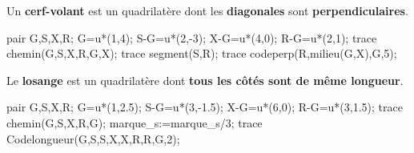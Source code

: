 \begin{changemargin}{-5mm}{-15mm}
    \begin{definition}
        \begin{minipage}{0.6\linewidth}
            Un \textbf{cerf-volant} est un quadrilatère dont les \textbf{diagonales} sont \textbf{perpendiculaires}.    
        \end{minipage}
        \hfill
        \begin{minipage}{0.3\linewidth}
            \begin{Geometrie}
                pair G,S,X,R;
                G=u*(1,4);
                S-G=u*(2,-3);
                X-G=u*(4,0);
                R-G=u*(2,1);
                trace chemin(G,S,X,R,G,X);
                trace segment(S,R);
                trace codeperp(R,milieu(G,X),G,5);
            \end{Geometrie}
        \end{minipage}
    \end{definition}

    \begin{definition}
        \begin{minipage}{0.5\linewidth}
            Le \textbf{losange} est un quadrilatère dont \textbf{tous les côtés sont de même longueur}.
        \end{minipage}
        \hfill
        \begin{minipage}{0.5\linewidth}
            \begin{center}
                \begin{Geometrie}
                    pair G,S,X,R;
                    G=u*(1,2.5);
                    S-G=u*(3,-1.5);
                    X-G=u*(6,0);
                    R-G=u*(3,1.5);
                    trace chemin(G,S,X,R,G);
                    marque_s:=marque_s/3;
                    trace Codelongueur(G,S,S,X,X,R,R,G,2);
                \end{Geometrie} 
            \end{center}
        \end{minipage}
    \end{definition}
    

\end{changemargin}
